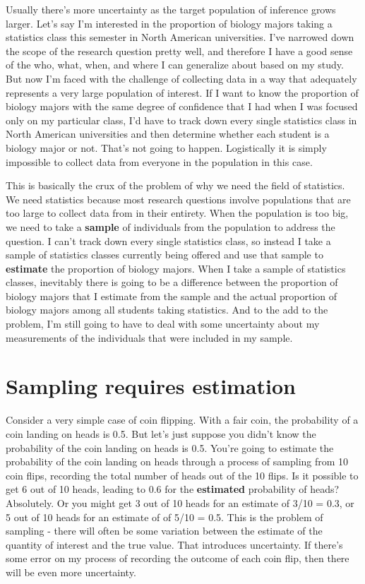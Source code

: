 \documentclass[
]{book}
\begin{document}
Usually there's more uncertainty as the target population of inference grows larger. Let's say I'm interested in the proportion of biology majors taking a statistics class this semester in North American universities. I've narrowed down the scope of the research question pretty well, and therefore I have a good sense of the who, what, when, and where I can generalize about based on my study. But now I'm faced with the challenge of collecting data in a way that adequately represents a very large population of interest. If I want to know the proportion of biology majors with the same degree of confidence that I had when I was focused only on my particular class, I'd have to track down every single statistics class in North American universities and then determine whether each student is a biology major or not. That's not going to happen. Logistically it is simply impossible to collect data from everyone in the population in this case.

This is basically the crux of the problem of why we need the field of statistics. We need statistics because most research questions involve populations that are too large to collect data from in their entirety. When the population is too big, we need to take a \textbf{sample} of individuals from the population to address the question. I can't track down every single statistics class, so instead I take a sample of statistics classes currently being offered and use that sample to \textbf{estimate} the proportion of biology majors. When I take a sample of statistics classes, inevitably there is going to be a difference between the proportion of biology majors that I estimate from the sample and the actual proportion of biology majors among all students taking statistics. And to the add to the problem, I'm still going to have to deal with some uncertainty about my measurements of the individuals that were included in my sample.

\section{Sampling requires estimation}\label{sampling-requires-estimation}

Consider a very simple case of coin flipping. With a fair coin, the probability of a coin landing on heads is 0.5. But let's just suppose you didn't know the probability of the coin landing on heads is 0.5. You're going to estimate the probability of the coin landing on heads through a process of sampling from 10 coin flips, recording the total number of heads out of the 10 flips. Is it possible to get 6 out of 10 heads, leading to 0.6 for the \textbf{estimated} probability of heads? Absolutely. Or you might get 3 out of 10 heads for an estimate of 3/10 = 0.3, or 5 out of 10 heads for an estimate of of 5/10 = 0.5. This is the problem of sampling - there will often be some variation between the estimate of the quantity of interest and the true value. That introduces uncertainty. If there's some error on my process of recording the outcome of each coin flip, then there will be even more uncertainty.
\end{document}
